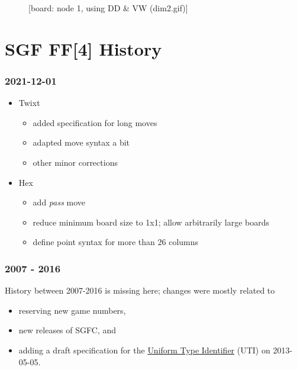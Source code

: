 \begin{figure}
\centering
{}
\caption{{[}board: node 1, using DD \& VW (dim2.gif){]}}
\end{figure}

\newpage

\section{SGF FF{[}4{]} History}\label{sgf-ff4-history}

\subsubsection{2021-12-01}\label{section}

\begin{itemize}
\tightlist
\item
  Twixt

  \begin{itemize}
  \tightlist
  \item
    added specification for long moves
  \item
    adapted move syntax a bit
  \item
    other minor corrections
  \end{itemize}
\item
  Hex

  \begin{itemize}
  \tightlist
  \item
    add \emph{pass} move
  \item
    reduce minimum board size to 1x1; allow arbitrarily large boards
  \item
    define point syntax for more than 26 columns
  \end{itemize}
\end{itemize}

\subsubsection{2007 - 2016}\label{section-1}

History between 2007-2016 is missing here; changes were mostly related
to

\begin{itemize}
\item
  reserving new game numbers,
\item
  new releases of SGFC, and
\item
  adding a draft specification for the
  \href{https://red-bean.com/sgf/drafts/sgf-uti-draft-2013-05-05.html}{Uniform
  Type Identifier} (UTI) on 2013-05-05.
\end{itemize}

